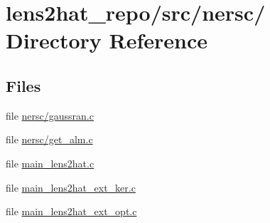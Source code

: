 \section{lens2hat\-\_\-repo/src/nersc/ Directory Reference}
\label{dir_8fef260a2096467668e67e0165d48090}
\subsection*{Files}
\begin{DoxyCompactItemize}
\item 
file \hyperlink{nersc_2gaussran_8c}{nersc/gaussran.\-c}
\item 
file \hyperlink{nersc_2get__alm_8c}{nersc/get\-\_\-alm.\-c}
\item 
file \hyperlink{main__lens2hat_8c}{main\-\_\-lens2hat.\-c}
\item 
file \hyperlink{main__lens2hat__ext__ker_8c}{main\-\_\-lens2hat\-\_\-ext\-\_\-ker.\-c}
\item 
file \hyperlink{main__lens2hat__ext__opt_8c}{main\-\_\-lens2hat\-\_\-ext\-\_\-opt.\-c}
\end{DoxyCompactItemize}
